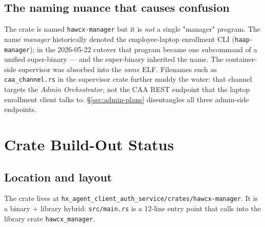 \documentclass[11pt, a4paper]{article}
\newcommand{\code}[1]{\texttt{\small #1}}
\newcommand{\filepath}[1]{\textcolor{accentpurple}{\texttt{\small #1}}}
\begin{document}
\subsection*{The naming nuance that causes confusion}

The crate is named \code{hawcx-manager} but it is \emph{not} a single "manager"
program. The name \emph{manager} historically denoted the employee-laptop
enrollment CLI (\code{haap-manager}); in the 2026-05-22 cutover that program
became one subcommand of a unified super-binary --- and the super-binary
inherited the name. The container-side supervisor was absorbed into the
\emph{same} ELF. Filenames such as \code{caa\_channel.rs} in the supervisor
crate further muddy the water: that channel targets the \emph{Admin
Orchestrator}, not the CAA REST endpoint that the laptop enrollment client
talks to. \S\ref{sec:admin-plane} disentangles all three admin-side
endpoints.

\clearpage

\section{Crate Build-Out Status}\label{sec:buildout}

\subsection{Location and layout}

The crate lives at \filepath{hx\_agent\_client\_auth\_service/crates/hawcx-manager}.
It is a binary + library hybrid: \code{src/main.rs} is a 12-line entry point
that calls into the library crate \code{hawcx\_manager}.
\end{document}
